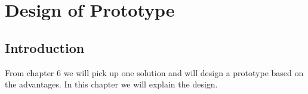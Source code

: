 \chapter{Design of Prototype}
\section{Introduction}
From chapter 6 we will pick up one solution and will design a prototype based on the advantages. In this chapter we will explain the design.